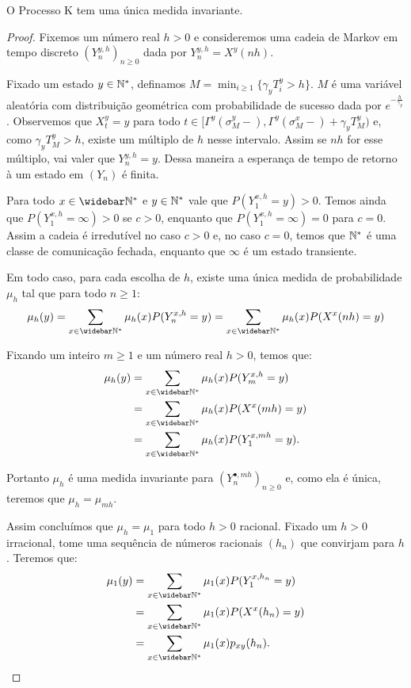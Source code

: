 \begin{proposicao}
  \label{prop:existe-unica-invariante}
  O Processo K tem uma única medida invariante.
\end{proposicao}
\begin{proof}
  Fixemos um número real $h > 0$ e consideremos uma cadeia de Markov em
  tempo discreto $(Y^{y, h}_n)_{n \geq 0}$ dada por $Y^{y, h}_n =
  X^y(n h)$.

  Fixado um estado $y \in {\mathbb{N^*}}$, definamos $M = \min_{i \geq 1} \{
  \gamma_y T_i^y > h \}$. $M$ é uma variável aleatória com
  distribuição geométrica com probabilidade de sucesso dada por
  $e^{-\frac{h}{\gamma_y}}$. Observemos que $X_t^y = y$ para todo $t
  \in [\Gamma^y(\sigma_M^y-), \Gamma^y(\sigma_M^x-) + \gamma_y T_M^y)$
  e, como $\gamma_y T_M^y > h$, existe um múltiplo de $h$ nesse
  intervalo. Assim se $n h$ for esse múltiplo, vai valer que $Y_n^{y,
    h} = y$. Dessa maneira a esperança de tempo de retorno à um estado
  em $(Y_n)$ é finita.

  Para todo $x \in \Nzb$ e $y \in {\mathbb{N^*}}$ vale que $P (Y^{x, h}_1 = y) >
  0$.  Temos ainda que $P (Y^{x, h}_1 = \infty ) > 0$ se $c > 0$,
  enquanto que $P (Y^{x, h}_1 = \infty) = 0$ para $c = 0$. Assim a
  cadeia é irredutível no caso $c > 0$ e, no caso $c = 0$, temos que
  ${\mathbb{N^*}}$ é uma classe de comunicação fechada, enquanto que $\infty$ é
  um estado transiente.


  Em todo caso, para cada escolha de $h$, existe uma única medida de
  probabilidade $\mu_h$ tal que para todo $n \geq 1$:
  \begin{displaymath}
    \mu_h (y) = \sum_{x \in \Nzb} \mu_h(x) P ( Y_n^ {x, h} = y) =
    \sum_{x \in \Nzb} \mu_h(x) P ( X^x (nh) = y)
  \end{displaymath}

  Fixando um inteiro $m \geq 1$ e um número real $h > 0$, temos que:
  \begin{align*}
    \mu_h (y) &= \sum_{x \in \Nzb} \mu_h(x) P ( Y_{m}^ {x, h} = y)\\
    &= \sum_{x \in \Nzb} \mu_h(x) P ( X^x (m h) = y) \\
    &= \sum_{x \in \Nzb} \mu_h(x) P ( Y_{1}^ {x, m h} = y).
  \end{align*}

  Portanto $\mu_h$ é uma medida invariante para $(Y^{\bullet, mh}_n)_{n
    \geq 0}$ e, como ela é única, teremos que $\mu_h = \mu_{m h}$.

  Assim concluímos que $\mu_{h} = \mu_1$ para todo $h > 0$ racional.
  Fixado um $h > 0$ irracional, tome uma sequência de números
  racionais $(h_n)$ que convirjam para $h$. Teremos que:
  \begin{align*}
    \mu_1(y) &= \sum_{x \in \Nzb} \mu_1(x) P ( Y_{1}^ {x, h_n} = y)\\
    &= \sum_{x \in \Nzb} \mu_1(x) P ( X^x(h_n) = y)\\
    &= \sum_{x \in \Nzb} \mu_1(x) p_{x y} (h_n).    
  \end{align*}
  

\end{proof}
